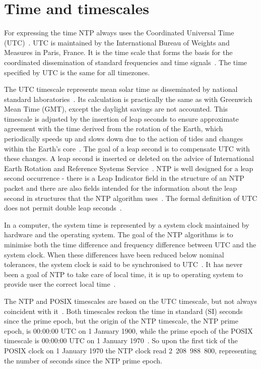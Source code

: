 
\section{Time and timescales}\label{sec:ntp-time}
For expressing the time NTP always uses the Coordinated Universal Time (UTC)~\cite{rfc5905}.
UTC is maintained by the International Bureau of Weights and Measures in Paris, France.
It is the time scale that forms the basis for the coordinated dissemination
of standard frequencies and time signals~\cite{bipm-utc}.
The time specified by UTC is the same for all timezones.

The UTC timescale represents mean solar time as disseminated by national
standard laboratories~\cite{rfc5905}.
Its calculation is practically the same as with Greenwich Mean Time (GMT),
except the daylight savings are not accounted.
This timescale is adjusted by the insertion of leap seconds to ensure approximate
agreement with the time derived from the rotation of the Earth,
which periodically speeds up and slows down due to the action
of tides and changes within the Earth's core~\cite{bipm-utc}.
The goal of a leap second is to compensate UTC with these changes.
A leap second is inserted or deleted on the advice of
International Earth Rotation and Reference Systems Service~\cite{bipm-utc}.
NTP is well designed for a leap second occurrence -
there is a Leap Indicator field
in the structure of an NTP packet and there are also fields intended for
the information about the leap second in structures that the NTP algorithm uses~\cite{rfc5905}.
The formal definition of UTC does not permit double leap seconds~\cite{posix}.

In a computer, the system time is represented by a system clock maintained by
hardware and the operating system.
The goal of the NTP algorithms is to minimise
both the time difference and frequency difference between UTC and the system clock.
When these differences have been reduced below nominal
tolerances, the system clock is said to be synchronised to UTC~\cite{rfc5905}.
It has never been a goal of NTP to take care of local time,
it is up to operating system to provide user the correct local time~\cite{ntp-overview}.

The NTP and POSIX timescales are based on the UTC timescale,
but not always coincident with it~\cite{ntp-leap}.
Both timescales reckon the time in standard (SI) seconds since the prime epoch,
but the origin of the NTP timescale, the NTP prime epoch, is 00:00:00 UTC on 1 January 1900,
while the prime epoch of the POSIX timescale is 00:00:00 UTC on 1 January 1970~\cite{ntp-leap}.
So upon the first tick of the POSIX clock on 1 January 1970 the NTP clock read 2~208~988~800,
representing the number of seconds since the NTP prime epoch.
